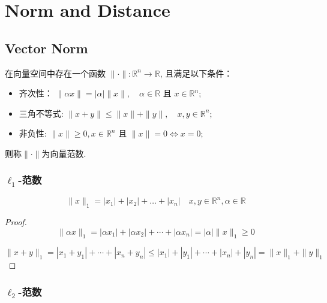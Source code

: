 \chapter{Norm and Distance}

\section{Vector Norm}

\begin{definition}
    在向量空间中存在一个函数 $ \|\cdot\|: \mathbb{R}^{n} \rightarrow \mathbb{R} $, 且满足以下条件：

\begin{itemize}
    \item 齐次性： $ \|\alpha x\|=|\alpha|\|x\|, \quad \alpha \in \mathbb{R} $ 且 $ x \in \mathbb{R}^{n} $;
    \item 三角不等式: $ \|x+y\| \leq\|x\|+\|y\|, \quad x, y \in \mathbb{R}^{n} $;
    \item 非负性: $ \|x\| \geq {0}, {x} \in \mathbb{R}^{n} $ 且 $ \|{x}\|=0 \Leftrightarrow {x}=0 $;
\end{itemize}
则称$\|\cdot\|$为向量范数. 
\end{definition}







\subsection{$ \ell_{1} $-范数}

\begin{example}
    $$ \|x\|_{1}=\left|x_{1}\right|+\left|x_{2}\right|+\ldots+\left|x_{n}\right| \quad x, y \in \mathbb{R}^{n}, \alpha \in \mathbb{R} $$
\end{example}

\begin{proof}
    $$ \|\alpha x\|_{1}=\left|\alpha x_{1}\right|+\left|\alpha x_{2}\right|+\cdots+\left|\alpha x_{n}\right|=|\alpha|\|x\|_{1} \geq 0 $$

    $$ \|x+y\|_{1}=\left|x_{1}+y_{1}\right|+\cdots+\left|x_{n}+y_{n}\right| \leq\left|x_{1}\right|+\left|y_{1}\right|+\cdots+\left|x_{n}\right|+\left|y_{n}\right|=\|x\|_{1}+\|y\|_{1} $$
\end{proof}

\subsection{$ \ell_{2} $-范数}


